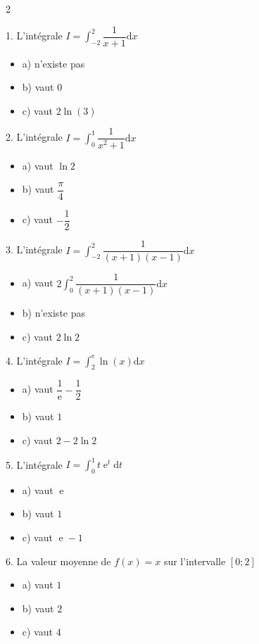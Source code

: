 \documentclass[11pt,a4paper]{article}
\DeclareMathOperator{\e}{e}
\begin{document}
	\begin{multicols}{2}
		
		1. L'intégrale $I=\displaystyle \int_{-2}^{2} \dfrac{1}{x+1} \mathrm{d}x$
		\begin{itemize}[label=$\square$]
			\item   a) n'existe pas
			\item   b) vaut 0
			\item   c) vaut $2\ln(3)$
		\end{itemize}
		
		
		2. L'intégrale $I=\displaystyle \int_{0}^{1} \dfrac{1}{x^2+1} \mathrm{d}x$
		\begin{itemize}[label=$\square$]
			\item   a) vaut $\ln2$
			\item   b) vaut $\dfrac{\pi}{4}$
			\item   c) vaut $-\dfrac{1}{2}$
		\end{itemize}
		
		
		3. L'intégrale $I=\displaystyle \int_{-2}^{2} \dfrac{1}{(x+1)(x-1)} \mathrm{d}x$
		\begin{itemize}[label=$\square$]
			\item   a) vaut $2\displaystyle \int_{0}^{2} \dfrac{1}{(x+1)(x-1)} \mathrm{d}x$
			\item   b) n'existe pas
			\item   c) vaut $2\ln2$
		\end{itemize}
		
		
		4. L'intégrale $I=\displaystyle \int_{2}^{\e} \ln(x) \mathrm{d}x$
		\begin{itemize}[label=$\square$]
			\item   a) vaut $\dfrac{1}{\e}-\dfrac{1}{2}$
			\item   b) vaut $1$
			\item   c) vaut $2-2\ln2$
		\end{itemize}
		
		5. L'intégrale $I=\displaystyle \int_{0}^{1} t\e^t \mathrm{d}t$
		\begin{itemize}[label=$\square$]
			\item   a) vaut $\e$
			\item   b) vaut $1$
			\item   c) vaut $\e -1$
		\end{itemize}
		
		6. La valeur moyenne de $f(x)=x$ sur l'intervalle $[0;2]$
		\begin{itemize}[label=$\square$]
			\item   a) vaut $1$
			\item   b) vaut $2$
			\item   c) vaut $4$
		\end{itemize}
		
	\end{multicols}
	
\end{document}

